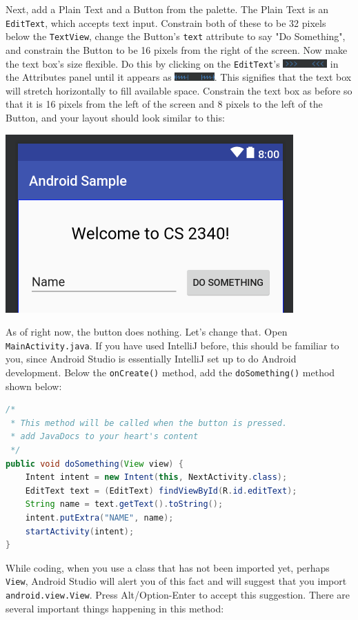 \documentclass{article}
\begin{document}
Next, add a Plain Text and a Button from the palette. The Plain Text is an \texttt{EditText}, which accepts text input. Constrain both of these to be 32 pixels below the \texttt{TextView}, change the Button's \texttt{text} attribute to say "Do Something", and constrain the Button to be 16 pixels from the right of the screen. Now make the text box's size flexible. Do this by clicking on the \texttt{EditText}'s \includegraphics[height=9pt]{images/fixed.png} in the Attributes panel until it appears as \includegraphics[height=9pt]{images/match.png}. This signifies that the text box will stretch horizontally to fill available space. Constrain the text box as before so that it is 16 pixels from the left of the screen and 8 pixels to the left of the Button, and your layout should look similar to this:
\begin{center}\includegraphics[width=.4\textwidth]{images/ui.png}\end{center}
As of right now, the button does nothing. Let's change that. Open \texttt{MainActivity.java}. If you have used IntelliJ before, this should be familiar to you, since Android Studio is essentially IntelliJ set up to do Android development. Below the \texttt{onCreate()} method, add the \texttt{doSomething()} method shown below:
\begin{lstlisting}[language=Java]
/* 
 * This method will be called when the button is pressed.
 * add JavaDocs to your heart's content
 */
public void doSomething(View view) {
    Intent intent = new Intent(this, NextActivity.class);
    EditText text = (EditText) findViewById(R.id.editText);
    String name = text.getText().toString();
    intent.putExtra("NAME", name);
    startActivity(intent);
}
\end{lstlisting}
While coding, when you use a class that has not been imported yet, perhaps \texttt{View}, Android Studio will alert you of this fact and will suggest that you import \texttt{android.view.View}. Press Alt/Option-Enter to accept this suggestion. There are several important things happening in this method:
\end{document}
